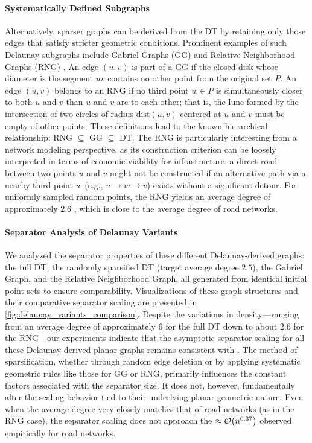 \paragraph{Systematically Defined Subgraphs}
Alternatively, sparser graphs can be derived from the DT by retaining only those edges that satisfy stricter geometric conditions. Prominent examples of such Delaunay subgraphs include Gabriel Graphs (GG) \cite{gabriel_new_1969} and Relative Neighborhood Graphs (RNG) \cite{toussaint_relative_1980}.
An edge \((u,v)\) is part of a GG if the closed disk whose diameter is the segment \(uv\) contains no other point from the original set \(P\).
An edge \((u,v)\) belongs to an RNG if no third point \(w \in P\) is simultaneously closer to both \(u\) and \(v\) than \(u\) and \(v\) are to each other; that is, the lune formed by the intersection of two circles of radius \(\text{dist}(u,v)\) centered at \(u\) and \(v\) must be empty of other points.
These definitions lead to the known hierarchical relationship: RNG \(\subseteq\) GG \(\subseteq\) DT.
The RNG is particularly interesting from a network modeling perspective, as its construction criterion can be loosely interpreted in terms of economic viability for infrastructure: a direct road between two points \(u\) and \(v\) might not be constructed if an alternative path via a nearby third point \(w\) (e.g., \(u \to w \to v\)) exists without a significant detour.
For uniformly sampled random points, the RNG yields an average degree of approximately \(2.6\) \cite{buhl_topological_2006}, which is close to the average degree of road networks.

\paragraph{Separator Analysis of Delaunay Variants}
We analyzed the separator properties of these different Delaunay-derived graphs: the full DT, the randomly sparsified DT (target average degree \(2.5\)), the Gabriel Graph, and the Relative Neighborhood Graph, all generated from identical initial point sets to ensure comparability.
Visualizations of these graph structures and their comparative separator scaling are presented in \cref{fig:delaunay_variants_comparison}.
Despite the variations in density—ranging from an average degree of approximately 6 for the full DT down to about \(2.6\) for the RNG—our experiments indicate that the asymptotic separator scaling for all these Delaunay-derived planar graphs remains consistent with .
The method of sparsification, whether through random edge deletion or by applying systematic geometric rules like those for GG or RNG, primarily influences the constant factors associated with the separator size. It does not, however, fundamentally alter the  scaling behavior tied to their underlying planar geometric nature.
Even when the average degree very closely matches that of road networks (as in the RNG case), the separator scaling does not approach the \(\approx \mathcal{O}\!\left(n^{0.37}\right)\) observed empirically for road networks.

